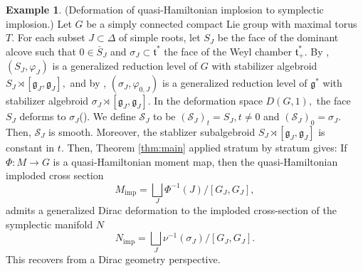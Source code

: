 \documentclass[reqno]{amsart}
\theoremstyle{plain}
\theoremstyle{definition}
\newtheorem{Exp}[Thm]{Example}
\newcommand{\g}{\mathfrak{g}}
\newcommand{\too}{\longrightarrow}
\renewcommand{\S}{\mathcal{S}}
\renewcommand{\t}{\mathfrak{t}}
\newcommand{\imp}{\text{imp}}
\begin{document}
\begin{Exp}(Deformation of quasi-Hamiltonian implosion to symplectic implosion.) Let $G$ be a simply connected compact Lie group with maximal torus $T$. For each subset $J\subset \Delta$ of simple roots, let $S_J$ be the face of the dominant alcove such that $0\in \bar{S}_{J}$ and $\sigma_{J} \subset \t^{*}$ the face of the Weyl chamber $\t^{*}_{+}.$ By \cite[]{bualibanu2026reduction}, $(S_{J},\varphi_J)$ is a generalized reduction level of $G$ with stabilizer algebroid $S_{J} \rtimes [\g_{J},\g_{J}],$ and by \cite[]{bualibanu2026reduction}, $(\sigma_J,\varphi_{0,J})$ is a generalized reduction level of $\g^{*}$ with stabilizer algebroid $\sigma_{J} \rtimes [\g_{J},\g_{J}].$ In the deformation space $D(G,{1}),$ the face $S_{J}$ deforms to $\sigma_{J}$(\cite[]{maiza2026multiplicative}). We define $\S_J$ to be $(\S_J)_t = S_J, t\neq 0$ and $(\S_J)_0 = \sigma_J$. Then, $\S_J$ is smooth. Moreover, the stablizer subalgebroid $S_J \rtimes [\g_J,\g_J]$ is constant in $t$. Then, Theorem \ref{thm:main} applied stratum by stratum gives: If $\Phi: M\too G$ is a quasi-Hamiltonian moment map, then the quasi-Hamiltonian imploded cross section \[
M_{\imp} = \bigsqcup_{J} \Phi^{-1}(J)/[G_J,G_J],
\]  
admits a generalized Dirac deformation to the imploded cross-section of the symplectic manifold $N$ \[
N_{\imp} = \bigsqcup_{J} \nu^{-1}(\sigma_J)/[G_J,G_J].
\] 
This recovers \cite[]{maiza2026multiplicative} from a Dirac geometry perspective.
\end{Exp}
\end{document}
